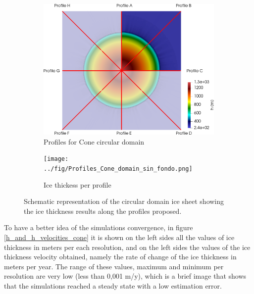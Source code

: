 \documentclass{article}
\begin{document}
\begin{figure}
	\centering
	\begin{subfigure}{.5\textwidth}
		\centering
		\includegraphics[width=0.99\linewidth]{../fig/Profiles_Cone_combined_domains.png}
		\caption{Profiles for Cone circular domain}
		\label{Schematic_Cone}
	\end{subfigure}%
	\begin{subfigure}{.5\textwidth}
		\centering
		\texttt{[image: ../fig/Profiles\_Cone\_domain\_sin\_fondo.png]}
		\caption{Ice thickess per profile}
		\label{Profiles_cone}
	\end{subfigure}
	\caption{Schematic representation of the circular domain ice sheet showing the ice thickness results along the profiles proposed.}
	\label{Cone_scheme}
\end{figure}

To have a better idea of the simulations convergence, in figure \ref{h_and_h_velocities_cone} it is shown on the left sides all the values of ice thickness in meters per each resolution, and on the left sides the values of the ice thickness velocity obtained, namely the rate of change of the ice thickness in meters per year. The range of these values, maximum and minimum per resolution are very low (less than 0,001 m/y), which is a brief image that shows that the simulations reached a steady state with a low estimation error. 
\end{document}
